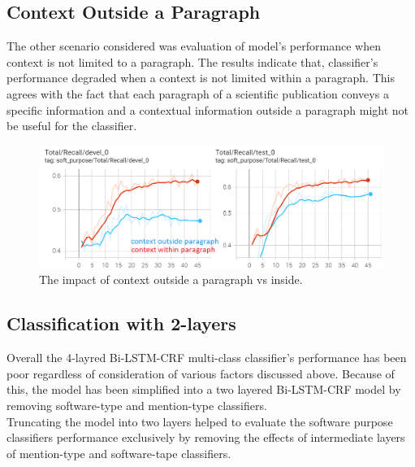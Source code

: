 \subsection{Context Outside a Paragraph}
\label{sec:chapter06:contxtOutside}


The other scenario considered was evaluation of model’s performance when context is not limited to a paragraph. The results indicate that, classifier’s performance degraded when a context is not limited within a paragraph. This agrees with the fact that each paragraph of a scientific publication conveys a specific information and a contextual information outside a paragraph might not be useful for the classifier. 

\begin{figure}[htbp]
	\centering
	\includegraphics[width=.90\textwidth]{4.graphics/figures/ch_6/4.context_outside_paragraph_vs_inside/HD/1}
	\caption{The impact of context outside a paragraph vs inside.}
	\label{fig:chapter06:with}
\end{figure}

\subsection{Classification with 2-layers}
\label{sec:chapter06:2lc}

Overall the 4-layred \ac{Bi-LSTM-CRF} multi-class classifier’s performance has been poor regardless of consideration of various factors discussed above. Because of this, the model has been simplified into a two layered \ac{Bi-LSTM-CRF} model by removing software-type and mention-type classifiers. \\

Truncating the model into two layers helped to evaluate the software purpose classifiers performance exclusively by removing the effects of intermediate layers of mention-type and software-tape classifiers. \\


